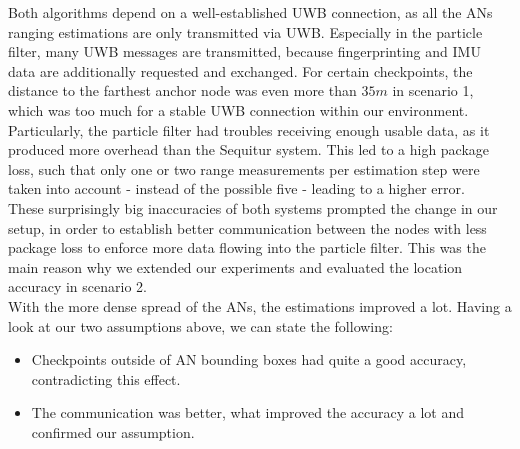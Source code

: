 \noindent\hspace*{5mm}%
Both algorithms depend on a well-established UWB connection, as all the ANs ranging estimations are only transmitted via UWB. Especially in the particle filter, many UWB messages are transmitted, because fingerprinting and IMU data are additionally requested and exchanged. For certain checkpoints, the distance to the farthest anchor node was even more than $35m$ in scenario 1, which was too much for a stable UWB connection within our environment. Particularly, the particle filter had troubles receiving enough usable data, as it produced more overhead than the Sequitur system. This led to a high package loss, such that only one or two range measurements per estimation step were taken into account - instead of the possible five - leading to a higher error. \\
\noindent\hspace*{5mm}%
These surprisingly big inaccuracies of both systems prompted the change in our setup, in order to establish better communication between the nodes with less package loss to enforce more data flowing into the particle filter. This was the main reason why we extended our experiments and evaluated the location accuracy in scenario 2.\\
\noindent\hspace*{5mm}%
With the more dense spread of the ANs, the estimations improved a lot. Having a look at our two assumptions above, we can state the following:

\begin{itemize}
\item Checkpoints outside of AN bounding boxes had quite a good accuracy, contradicting this effect.
\item The communication was better, what improved the accuracy a lot and confirmed our assumption.
\end{itemize}

